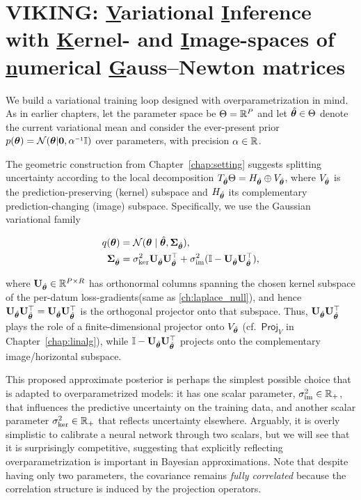 \section{VIKING: \underline{V}ariational \underline{I}nference with \underline{K}ernel- and \underline{I}mage-spaces of \underline{n}umerical \underline{G}auss--Newton matrices}
\label{sec:kivi}
We build a variational training loop designed with overparametrization in mind. As in earlier chapters, let the parameter space be $\Theta=\mathbb{R}^P$ and let $\hat{\bm{\theta}}\in\Theta$ denote the current variational mean and consider the ever-present prior $p(\bm{\theta}) = \mathcal{N}(\bm{\theta} | \mathbf{0}, \alpha^{\scriptscriptstyle{-1}} \mathbb{I})$ over parameters, with precision $\alpha \in \mathbb{R}$.

The geometric construction from Chapter~\ref{chap:setting} suggests splitting uncertainty according to the local decomposition
\(
T_{\hat{\bm{\theta}}}\Theta = H_{\hat{\bm{\theta}}}\oplus V_{\hat{\bm{\theta}}}
\),
where \(V_{\hat{\bm{\theta}}}\) is the prediction-preserving (kernel) subspace and \(H_{\hat{\bm{\theta}}}\) its complementary prediction-changing (image) subspace.
Specifically, we use the Gaussian variational family

\begin{align}
  \label{eq:approximate-posterior}
  q(\bm{\theta})
  &=
  \mathcal{N}(\bm{\theta}\mid \hat{\bm{\theta}}, \mathbf{\Sigma}_{\hat{\bm{\theta}}}),
  \\
  \mathbf{\Sigma}_{\hat{\bm{\theta}}}
  &=
  \sigma_{\ker}^2 \mathbf{U}_{\hat{\bm{\theta}}}\mathbf{U}_{\hat{\bm{\theta}}}^{\top} + \sigma_{\operatorname{im}}^2 (\mathbb{I} - \mathbf{U}_{\hat{\bm{\theta}}}\mathbf{U}_{\hat{\bm{\theta}}}^{\top}),
\end{align}

where \(\mathbf{U}_{\hat{\bm{\theta}}}\in\mathbb{R}^{P\times R}\) has orthonormal columns spanning the chosen kernel subspace of the per-datum loss-gradients(same as \cref{ch:laplace_null}), and hence
\(
\mathbf{U}_{\hat{\bm{\theta}}}\mathbf{U}_{\hat{\bm{\theta}}}^{\top}=\mathbf{U}_{\hat{\bm{\theta}}}\mathbf{U}_{\hat{\bm{\theta}}}^{\top}
\)
is the orthogonal projector onto that subspace.
Thus, \(\mathbf{U}_{\hat{\bm{\theta}}}\mathbf{U}_{\hat{\bm{\theta}}}^{\top}\) plays the role of a finite-dimensional projector onto \(V_{\hat{\bm{\theta}}}\) (cf.\ \(\textsf{Proj}_V\) in Chapter~\ref{chap:linalg}), while \(\mathbb{I}-\mathbf{U}_{\hat{\bm{\theta}}}\mathbf{U}_{\hat{\bm{\theta}}}^{\top}\) projects onto the complementary image/horizontal subspace.


This proposed approximate posterior is perhaps the simplest possible choice that is adapted to overparametrized models: it has one scalar parameter, $\sigma_{\operatorname{im}}^2 \in \mathbb{R}_+$, that influences the predictive uncertainty on the training data, and another scalar parameter $\sigma_{\ker}^2 \in \mathbb{R}_+$ that reflects uncertainty elsewhere.
Arguably, it is overly simplistic to calibrate a neural network through two scalars, but we will see that it is surprisingly competitive, suggesting that explicitly reflecting overparametrization is important in Bayesian approximations. Note that despite having only two parameters, the covariance remains \emph{fully correlated} because the correlation structure is induced by the projection operators.


